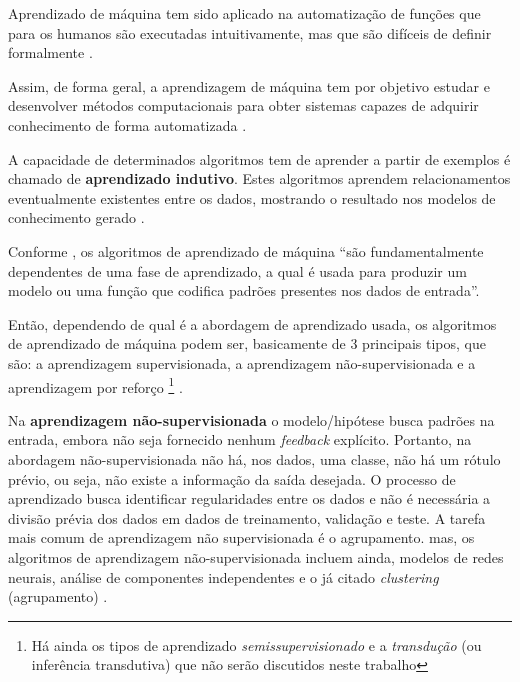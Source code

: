 Aprendizado de máquina tem sido aplicado na automatização de funções que para os humanos são executadas intuitivamente, mas que são difíceis de definir formalmente \cite{sarkar_2017}.

Assim, de forma geral, a aprendizagem de máquina tem por objetivo estudar e desenvolver métodos computacionais para obter sistemas capazes de adquirir conhecimento de forma automatizada \cite{lima_ia_2016}.

A capacidade de determinados algoritmos tem de aprender a partir de exemplos é chamado de \textbf{aprendizado indutivo}. Estes algoritmos aprendem relacionamentos eventualmente existentes entre os dados, mostrando o resultado nos modelos de conhecimento gerado \cite{goldschmidt2005} \cite{alpaydin_introduction_2014}.

Conforme , os algoritmos de aprendizado de máquina ``são fundamentalmente dependentes de uma fase de aprendizado, a qual é usada para produzir um modelo ou uma função que codifica padrões presentes nos dados de entrada''.

Então, dependendo de qual é a abordagem de aprendizado usada, os algoritmos de aprendizado de máquina podem ser, basicamente de 3 principais tipos, que são: a aprendizagem supervisionada, a aprendizagem não-supervisionada e a aprendizagem por reforço \footnote{Há ainda os tipos de aprendizado \textit{semissupervisionado} e a \textit{transdução} (ou inferência transdutiva) que não serão discutidos neste trabalho} \cite{Norvig2013} \cite{baeza-yates_recuperacao_2013}. 

Na \textbf{aprendizagem não-supervisionada} o modelo/hipótese busca padrões na entrada, embora não seja fornecido nenhum \textit{feedback} explícito. Portanto, na abordagem não-supervisionada não há, nos dados, uma classe, não há um rótulo prévio, ou seja, não existe a informação da saída desejada. O processo de aprendizado busca identificar regularidades entre os dados e não é necessária a divisão prévia dos dados em dados de treinamento, validação e teste.  A tarefa mais comum de aprendizagem não supervisionada é o agrupamento. mas, os algoritmos de aprendizagem não-supervisionada incluem ainda, modelos de redes neurais, análise de componentes independentes e o já citado \textit{clustering} (agrupamento) \cite{Norvig2013} \cite{Boscarioli2017} \cite{goldschmidt2005} \cite{aprenda_mineracao_fernando_amaral16}.

